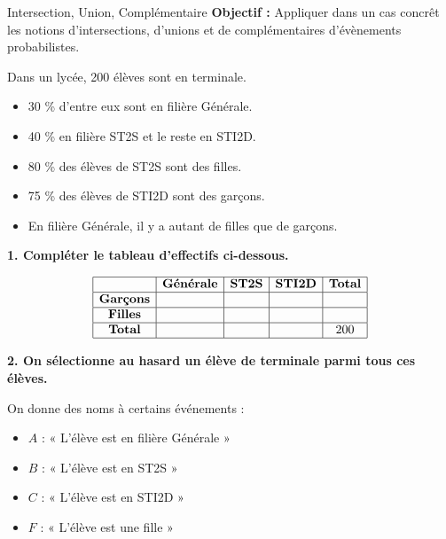 \documentclass[12pt]{article}
\theoremstyle{break}
\begin{document}
\noindent{
\makebox[0pt][l]{\textbf{\Niveau}}%
\makebox[\textwidth][c]{\textbf{\Chapitre}}%
\makebox[0pt][r]{\textbf{\Document}}
}

\begin{activite*}{Intersection, Union, Complémentaire}{}
    \textbf{Objectif :} Appliquer dans un cas concrêt les notions d'intersections, d'unions et de complémentaires d'évènements probabilistes.
\end{activite*}

Dans un lycée, 200 élèves sont en terminale.
\begin{itemize}
    \item 30 \% d’entre eux sont en filière Générale.
    \item 40 \% en filière ST2S et le reste en STI2D.
    \item 80 \% des élèves de ST2S sont des filles.
    \item 75 \% des élèves de STI2D sont des garçons.
    \item En filière Générale, il y a autant de filles que de garçons.
\end{itemize}

\textbf{1. Compléter le tableau d’effectifs ci-dessous.}

\[
\begin{array}{|c|c|c|c|c|}
\hline
 & \textbf{Générale} & \textbf{ST2S} & \textbf{STI2D} & \textbf{Total} \\
\hline
\textbf{Garçons} & & & & \\
\hline
\textbf{Filles} & & & & \\
\hline
\textbf{Total} & & & & 200 \\
\hline
\end{array}
\]

\textbf{2. On sélectionne au hasard un élève de terminale parmi tous ces élèves.}

On donne des noms à certains événements :
\begin{itemize}
    \item $A$ : « L’élève est en filière Générale »
    \item $B$ : « L’élève est en ST2S »
    \item $C$ : « L’élève est en STI2D »
    \item $F$ : « L’élève est une fille »
\end{itemize}
\end{document}
